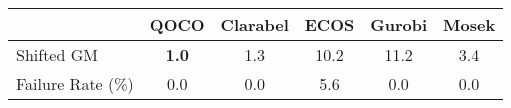 \begin{tabular}{lccccc}
  \hline
   & \textbf{QOCO} & \textbf{Clarabel} & \textbf{ECOS} & \textbf{Gurobi} & \textbf{Mosek} \\ \hline
  Shifted GM & \textbf{1.0} & 1.3 & 10.2 & 11.2 & 3.4 \\ 
  Failure Rate (\%) & 0.0 & 0.0 & 5.6 & 0.0 & 0.0 \\ \hline 
\end{tabular}
